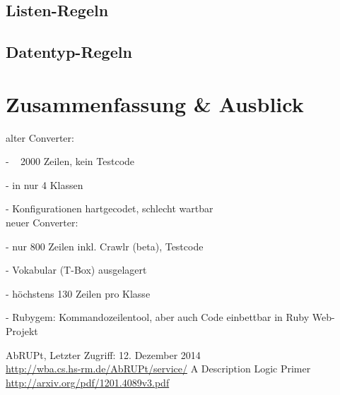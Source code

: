 \documentclass[runningheads,a4paper]{llncs}
\begin{document}
\subsection{Listen-Regeln}
\subsection{Datentyp-Regeln}

\section{Zusammenfassung \& Ausblick}
alter Converter:

- ~ 2000 Zeilen, kein Testcode

- in nur 4 Klassen

- Konfigurationen hartgecodet, schlecht wartbar
\\
neuer Converter:

- nur 800 Zeilen inkl. Crawlr (beta), Testcode

- Vokabular (T-Box) ausgelagert

- höchstens 130 Zeilen pro Klasse

- Rubygem: Kommandozeilentool, aber auch Code einbettbar in Ruby Web-Projekt





\begin{thebibliography}{4}

AbRUPt,
Letzter Zugriff: 12. Dezember 2014\\
\url{http://wba.cs.hs-rm.de/AbRUPt/service/}
A Description Logic Primer\\
\url{http://arxiv.org/pdf/1201.4089v3.pdf}

\end{thebibliography}
\end{document}
